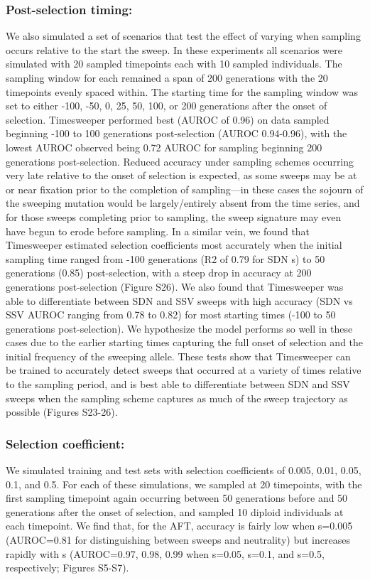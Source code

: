 \subsubsection{Post-selection timing:} We also simulated a set of scenarios that test the effect of varying when sampling occurs relative to the start the sweep. In these experiments all scenarios were simulated with 20 sampled timepoints each with 10 sampled individuals. The sampling window for each remained a span of 200 generations with the 20 timepoints evenly spaced within. The starting time for the sampling window was set to either -100, -50, 0, 25, 50, 100, or 200 generations after the onset of selection. Timesweeper performed best (AUROC of 0.96) on data sampled beginning -100 to 100 generations post-selection (AUROC 0.94-0.96), with the lowest AUROC observed being 0.72 AUROC for sampling beginning 200 generations post-selection. Reduced accuracy under sampling schemes occurring very late relative to the onset of selection is expected, as some sweeps may be at or near fixation prior to the completion of sampling—in these cases the sojourn of the sweeping mutation would be largely/entirely absent from the time series, and for those sweeps completing prior to sampling, the sweep signature may even have begun to erode before sampling. In a similar vein, we found that Timesweeper estimated selection coefficients most accurately when the initial sampling time ranged from -100 generations (R2 of 0.79 for SDN s) to 50 generations (0.85) post-selection, with a steep drop in accuracy at 200 generations post-selection (Figure S26).
We also found that Timesweeper was able to differentiate between SDN and SSV sweeps with high accuracy (SDN vs SSV AUROC ranging from 0.78 to 0.82) for most starting times (-100 to 50 generations post-selection). We hypothesize the model performs so well in these cases due to the earlier starting times capturing the full onset of selection and the initial frequency of the sweeping allele. These tests show that Timesweeper can be trained to accurately detect sweeps that occurred at a variety of times relative to the sampling period, and is best able to differentiate between SDN and SSV sweeps when the sampling scheme captures as much of the sweep trajectory as possible (Figures S23-26). \\

\subsubsection{Selection coefficient:} We simulated training and test sets with selection coefficients of 0.005, 0.01, 0.05, 0.1, and 0.5. For each of these simulations, we sampled at 20 timepoints, with the first sampling timepoint again occurring between 50 generations before and 50 generations after the onset of selection, and sampled 10 diploid individuals at each timepoint. We find that, for the AFT, accuracy is fairly low when s=0.005 (AUROC=0.81 for distinguishing between sweeps and neutrality) but increases rapidly with s (AUROC=0.97, 0.98, 0.99 when s=0.05, s=0.1, and s=0.5, respectively; Figures S5-S7).  \\

